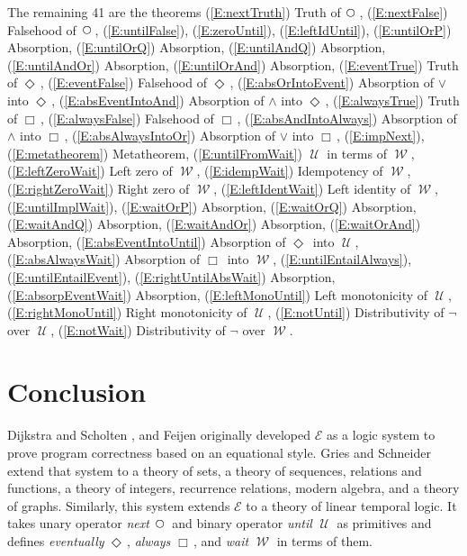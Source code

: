 \documentclass[12pt, fleqn, leqno]{article}
\newcommand{\Until}{\;\mathcal{U}\;}
\newcommand{\Wait}{\;\mathcal{W}\;}
\newcommand{\Next}{\;\,\text{\raisebox{3.5pt}{\circle{6}}}}
\newcommand{\Event}{\Diamond\,}
\newcommand{\Always}{\Box\,}
\begin{document}
The remaining 41 are the theorems
(\ref{E:nextTruth}) Truth of $\Next$,
(\ref{E:nextFalse}) Falsehood of $\Next$,
(\ref{E:untilFalse}),
(\ref{E:zeroUntil}),
(\ref{E:leftIdUntil}),
(\ref{E:untilOrP}) Absorption,
(\ref{E:untilOrQ}) Absorption,
(\ref{E:untilAndQ}) Absorption,
(\ref{E:untilAndOr}) Absorption,
(\ref{E:untilOrAnd}) Absorption,
(\ref{E:eventTrue}) Truth of $\Event$,
(\ref{E:eventFalse}) Falsehood of $\Event$,
(\ref{E:absOrIntoEvent}) Absorption of $\lor$ into $\Event$,
(\ref{E:absEventIntoAnd}) Absorption of $\land$ into $\Event$,
(\ref{E:alwaysTrue}) Truth of $\Always$,
(\ref{E:alwaysFalse}) Falsehood of $\Always$,
(\ref{E:absAndIntoAlways}) Absorption of $\land$ into $\Always$,
(\ref{E:absAlwaysIntoOr}) Absorption of $\lor$ into $\Always$,
(\ref{E:impNext}),
(\ref{E:metatheorem}) Metatheorem,
(\ref{E:untilFromWait}) $\Until$ in terms of $\Wait$,
(\ref{E:leftZeroWait}) Left zero of $\Wait$,
(\ref{E:idempWait}) Idempotency of $\Wait$,
(\ref{E:rightZeroWait}) Right zero of $\Wait$,
(\ref{E:leftIdentWait}) Left identity of $\Wait$,
(\ref{E:untilImplWait}),
(\ref{E:waitOrP}) Absorption,
(\ref{E:waitOrQ}) Absorption,
(\ref{E:waitAndQ}) Absorption,
(\ref{E:waitAndOr}) Absorption,
(\ref{E:waitOrAnd}) Absorption,
(\ref{E:absEventIntoUntil}) Absorption of $\Event$ into $\Until$,
(\ref{E:absAlwaysWait}) Absorption of $\Always$ into $\Wait$,
(\ref{E:untilEntailAlways}),
(\ref{E:untilEntailEvent}),
(\ref{E:rightUntilAbsWait}) Absorption,
(\ref{E:absorpEventWait}) Absorption,
(\ref{E:leftMonoUntil}) Left monotonicity of $\Until$,
(\ref{E:rightMonoUntil}) Right monotonicity of $\Until$,
(\ref{E:notUntil}) Distributivity of $\neg$ over $\Until$,
(\ref{E:notWait}) Distributivity of $\neg$ over $\Wait$.

\section{Conclusion}

Dijkstra and Scholten \cite{DandS}, and Feijen \cite{Feij} originally developed $\mathcal{E}$ as a logic system to prove
program correctness based on an equational style.
Gries and Schneider extend that system to a theory of sets, a theory of sequences,
relations and functions, a theory of integers, recurrence relations, modern algebra, and a theory of graphs.
Similarly, this system extends $\mathcal{E}$ to a theory of linear temporal logic.
It takes unary operator \textit{next} $\Next$ and binary operator \textit{until} $\Until$ as primitives and defines
\textit{eventually} $\Event$, \textit{always} $\Always$, and \textit{wait} $\Wait$ in terms of them.
\end{document}
